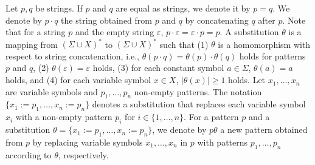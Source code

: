 Let $p,q$ be strings.
If $p$ and $q$ are equal as strings, we denote it by $p=q$.
We denote by $p\cdot q$ the string obtained from $p$ and $q$ by concatenating $q$ after $p$.
Note that for a string $p$ and the empty string $\varepsilon$, $p\cdot \varepsilon = \varepsilon \cdot p = p$.
%
%
%
A substitution $\theta$ is a mapping from $(\Sigma \cup X)^{\ast}$ to $(\Sigma \cup X)^{\ast}$ such that
(1) $\theta$ is a homomorphism with respect to string concatenation, i.e., $\theta(p \cdot q) = \theta(p) \cdot \theta(q)$ holds for patterns $p$ and $q$,
(2) $\theta(\varepsilon)=\varepsilon$ holds,
(3) for each constant symbol $a \in \Sigma$, $\theta(a) = a$ holds,
and (4) for each variable symbol $x \in X$, $|\theta(x)| \geq 1$ holds.
Let $x_{1},\ldots,x_{n}$ are variable symbols and $p_{1},\ldots,p_{n}$ non-empty patterns.
The notation $\{x_{1}:=p_{1},\ldots,x_{n}:=p_{n}\}$ denotes a substitution that replaces each variable symbol $x_{i}$
with a non-empty pattern $p_{i}$ for $i \in \{1,\ldots,n\}$.
For a pattern $p$ and a substitution $\theta=\{x_{1}:=p_{1},\ldots,x_{n}:=p_{n}\}$, we denote by $p\theta$ a new pattern obtained from $p$ by replacing variable symbols $x_1,\ldots,x_n$ in $p$ with patterns $p_1,\ldots,p_n$ according to $\theta$, respectively.
%
